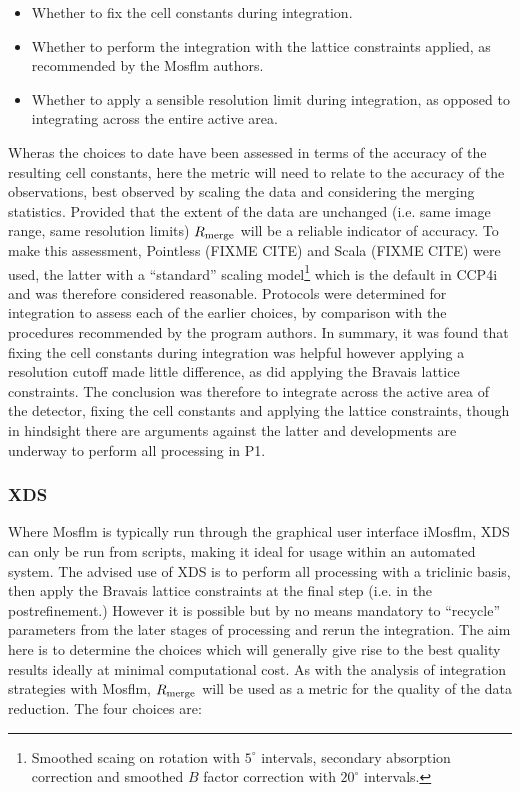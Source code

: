 \documentclass[a4paper,11pt]{article}
\begin{document}
\begin{itemize}
\item{Whether to fix the cell constants during integration.}
\item{Whether to perform the integration with the lattice constraints
    applied, as recommended by the Mosflm authors.}
\item{Whether to apply a sensible resolution limit during integration,
    as opposed to integrating across the entire active area.}
\end{itemize}

Wheras the choices to date have been assessed in terms of the accuracy
of the resulting cell constants, here the metric will need to relate
to the accuracy of the observations, best observed by scaling the data
and considering the merging statistics. Provided that the extent of
the data are unchanged (i.e. same image range, same resolution limits)
$R_{\rm{merge}}$ will be a reliable indicator of accuracy. To make
this assessment, Pointless (FIXME CITE) and Scala (FIXME CITE) were
used, the latter with a ``standard'' scaling model\footnote{Smoothed
  scaing on rotation with $5^{\circ}$ intervals, secondary absorption
  correction and smoothed $B$ factor correction with $20^{\circ}$
  intervals.}
which is the default in CCP4i and was therefore considered
reasonable. Protocols were determined for integration to assess each
of the earlier choices, by comparison with the procedures recommended
by the program authors. In summary, it was found that fixing the cell
constants during integration was helpful however applying a resolution
cutoff made little difference, as did applying the Bravais lattice
constraints. The conclusion was therefore to integrate across the
active area of the detector, fixing the cell constants and applying
the lattice constraints, though in hindsight there are arguments
against the latter and developments are underway to perform all
processing in P1.

\subsubsection{XDS}

Where Mosflm is typically run through the graphical user interface
iMosflm, XDS can only be run from scripts, making it ideal for usage
within an automated system. The advised use of XDS is to perform all
processing with a triclinic basis, then apply the Bravais lattice
constraints at the final step (i.e. in the postrefinement.) However it
is possible but by no means mandatory to ``recycle'' parameters from
the later stages of processing and rerun the integration. The aim here
is to determine the choices which will generally give rise to the best
quality results ideally at minimal computational cost. As with the
analysis of integration strategies with Mosflm, $R_{\rm{merge}}$ will
be used as a metric for the quality of the data reduction. The four
choices are:
\end{document}
